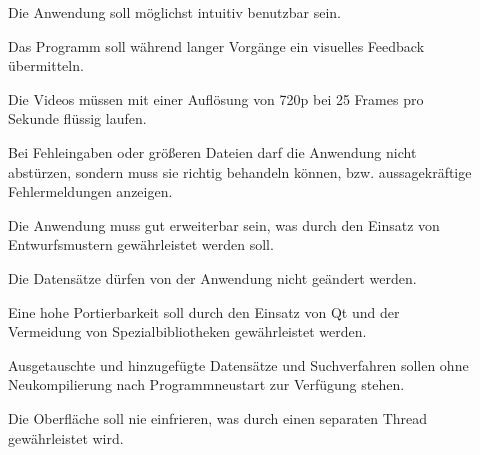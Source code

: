\begin{description}
  \item[] Die Anwendung soll möglichst intuitiv benutzbar sein.
  \item[] Das Programm soll während langer Vorgänge ein visuelles Feedback übermitteln.
  \item[] Die Videos müssen mit einer Auflösung  von 720p bei 25 Frames pro Sekunde flüssig laufen.
  \item[] Bei Fehleingaben oder größeren Dateien darf die Anwendung nicht abstürzen, sondern muss sie richtig behandeln können, bzw. aussagekräftige Fehlermeldungen anzeigen.
  \item[] Die Anwendung muss gut erweiterbar sein, was durch den Einsatz von Entwurfsmustern gewährleistet werden soll.
  \item[] Die Datensätze dürfen von der Anwendung nicht geändert werden.
  \item[] Eine hohe Portierbarkeit soll durch den Einsatz von \gls{Qt} und der Vermeidung von Spezialbibliotheken gewährleistet werden.
  \item[] Ausgetauschte und hinzugefügte Datensätze und Suchverfahren sollen ohne Neukompilierung nach Programmneustart zur Verfügung stehen.
  \item[] Die Oberfläche soll nie einfrieren, was durch einen separaten Thread gewährleistet wird.
\end{description}
\pagebreak
